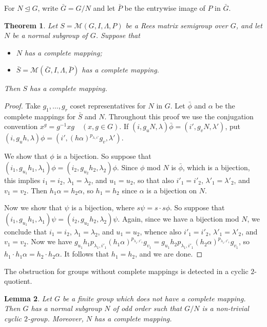 \documentclass[11pt]{article}
\theoremstyle{plain}
\newtheorem{theorem}{Theorem}[section]
\newtheorem{lemma}[theorem]{Lemma}
\theoremstyle{remark}
\theoremstyle{definition}
\theoremstyle{plain}
\begin{document}
{For $N\unlhd G$, write $\bar G=G/N$ and let $\bar P$ be
the entrywise image of $P$ in $\bar G$.}

\begin{theorem}
Let $S=\mathcal{M}(G,I,\Lambda,P)$ be a Rees matrix semigroup over $G$, and
let $N$ be a normal subgroup of $G$. Suppose that
\begin{itemize}\itemsep0pt
\item[(a)] $N$ has a complete mapping;
\item[(b)] $\bar{S}=\mathcal{M}(\bar G,I,\Lambda,\bar P)$ has a complete mapping.
\end{itemize}
Then $S$ has a complete mapping.
\label{t:goingup}
\end{theorem}
\begin{proof}
Take $g_1,\ldots,g_r$ coset representatives for $N$ in $G$. Let $\bar\phi$
and $\alpha$ be the complete mappings for $\bar S$ and $N$.
Throughout this proof we use the conjugation convention
\(x^g=g^{-1}xg \quad (x,g\in G).\)
If $(i,g_uN,\lambda)\bar\phi=(i',g_vN,\lambda')$, put
\((i,g_uh,\lambda)\phi=(i',(h\alpha)^{p_{\lambda,i'}}g_v,\lambda').\)

We show that $\phi$ is a bijection. So suppose that
\((i_1,g_{u_1}h_1,\lambda_1)\phi=(i_2,g_{u_2}h_2,{\lambda_2})\phi.\)
Since $\phi$ mod $N$ is $\bar\phi$, which is a bijection, this implies
$i_1=i_2$, $\lambda_1=\lambda_2$, and $u_1=u_2$, so that also $i'_1=i'_2$,
$\lambda'_1=\lambda'_2$, and $v_1=v_2$. Then
$h_1\alpha=h_2\alpha$, so $h_1=h_2$ since $\alpha$ is a bijection on $N$.

Now we show that $\psi$ is a bijection, where $s\psi=s\cdot s\phi$. So suppose
that
\((i_1,g_{u_1}h_1,\lambda_1)\psi=(i_2,g_{u_2}h_2,{\lambda_2})\psi.\)
Again, since we have a bijection mod $N$, we conclude that $i_1=i_2$,
$\lambda_1=\lambda_2$, and $u_1=u_2$, whence also $i'_1=i'_2$,
$\lambda'_1=\lambda'_2$, and $v_1=v_2$. Now we have
\(g_{u_1}h_1p_{\lambda_1,i'_1}(h_1\alpha)^{p_{\lambda_1,i'_1}}g_{v_1}
=g_{u_1}h_2p_{\lambda_1,i'_1}(h_2\alpha)^{p_{\lambda_1,i'_1}}g_{v_1}\), so $h_1\cdot h_1\alpha=h_2\cdot h_2\alpha$. It follows that $h_1=h_2$, and we are done.
\end{proof}

The obstruction for groups without complete mappings is detected in a cyclic $2$-quotient.

\begin{lemma}\label{l:cyclic2-quotient}
Let $G$ be a finite group which does not have a complete mapping. Then $G$
has a normal subgroup $N$ of odd order such that
\(G/N\)
is a non-trivial cyclic $2$-group. Moreover, $N$ has a complete mapping.
\end{lemma}
\end{document}
